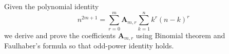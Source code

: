 Given the polynomial identity
\[
    n^{2m+1} = \sum_{r=0}^{m} \mathbf{A}_{m,r} \sum_{k=1}^{n} k^{r} (n-k)^{r}
\]
we derive and prove the coefficients $\mathbf{A}_{m,r}$ using Binomial theorem and Faulhaber's formula
so that odd-power identity holds.